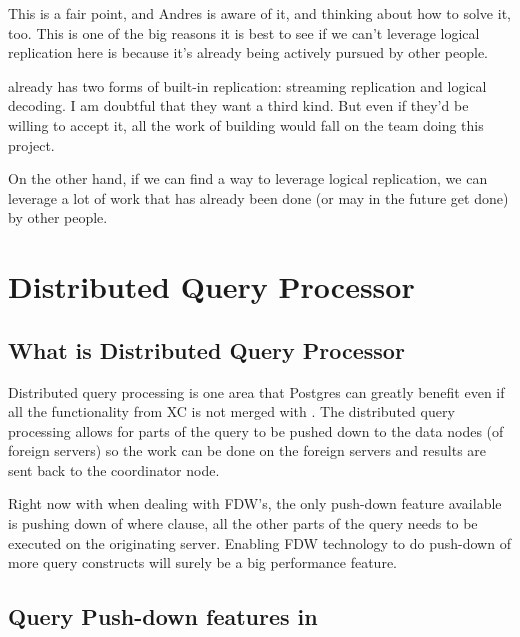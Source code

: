	This is a fair point, and Andres is aware of it, and thinking about how to solve it, too.
	This is one of the big reasons it is best to see if we can't leverage logical
	replication here is because it's already being actively pursued by other people.

	\PG{} already has two forms of built-in replication: streaming replication and
	logical decoding.
	I am doubtful that they want a third kind.
	But even if they'd be willing to accept it, all the work of building would fall
	on the team doing this project. 

	On the other hand, if we can find a way to leverage logical replication,
	we can leverage a lot of work that has already been done (or may in the future
	get done) by other people.



\section{Distributed Query Processor}



\subsection{What is Distributed Query Processor}

	Distributed query processing is one area that Postgres can greatly benefit
	even if all the functionality from XC is not merged with \PG.
	The distributed query processing allows for parts of the query to be pushed down
	to the data nodes (of foreign servers) so the work can be done on the foreign
	servers and results are sent back to the coordinator node.

	Right now with \PG{} when dealing with FDW's, the only push-down feature available
	is pushing down of where clause, all the other parts of the query needs to be
	executed on the originating server.
	Enabling \PG{} FDW technology to do push-down of more query constructs will surely
	be a big performance feature.



\subsection{Query Push-down features in \XC}

